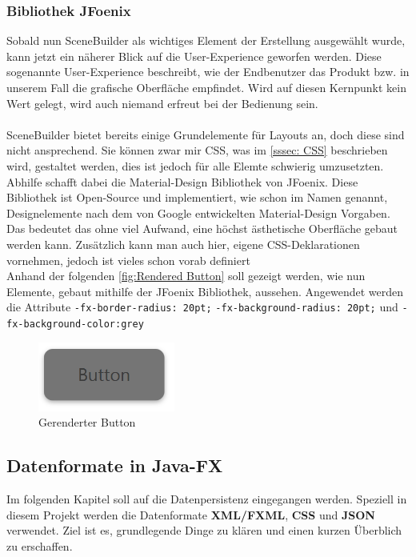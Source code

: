 \subsubsection{Bibliothek JFoenix}
Sobald nun SceneBuilder als wichtiges Element der Erstellung ausgewählt wurde, kann jetzt ein näherer Blick auf die User-Experience geworfen werden.
Diese sogenannte User-Experience beschreibt, wie der Endbenutzer das Produkt bzw. in unserem Fall die grafische Oberfläche empfindet.
Wird auf diesen Kernpunkt kein Wert gelegt, wird auch niemand erfreut bei der Bedienung sein.\\\\
SceneBuilder bietet bereits einige Grundelemente für Layouts an, doch diese sind nicht ansprechend.
Sie können zwar mir CSS, was im \autoref{sssec: CSS} beschrieben wird, gestaltet werden, dies ist jedoch für alle Elemte schwierig umzusetzten.
Abhilfe schafft dabei die Material-Design Bibliothek von JFoenix.
Diese Bibliothek ist Open-Source und implementiert, wie schon im Namen genannt, Designelemente nach dem von Google entwickelten Material-Design Vorgaben.
Das bedeutet das ohne viel Aufwand, eine höchst ästhetische Oberfläche gebaut werden kann.
Zusätzlich kann man auch hier, eigene CSS-Deklarationen vornehmen, jedoch ist vieles schon vorab definiert\\
Anhand der folgenden \autoref{fig:Rendered Button} soll gezeigt werden, wie nun Elemente, gebaut mithilfe der JFoenix Bibliothek, aussehen.
Angewendet werden die Attribute \lstinline{-fx-border-radius: 20pt;}  \lstinline{-fx-background-radius: 20pt;} und \lstinline{-fx-background-color:grey}
\begin{figure}[H]
    \centering
    \includegraphics[width=0.4\textwidth]{fig/ainf/RenderedButton.PNG}
    \caption{Gerenderter Button}
    \label{fig:Rendered Button}
\end{figure}
\subsection{Datenformate in Java-FX}\label{subsec:datenformate-in-java-fx}
Im folgenden Kapitel soll auf die Datenpersistenz eingegangen werden.
Speziell in diesem Projekt werden die Datenformate \textbf{XML/FXML}, \textbf{CSS} und \textbf{JSON} verwendet.
Ziel ist es, grundlegende Dinge zu klären und einen kurzen Überblich zu erschaffen.
